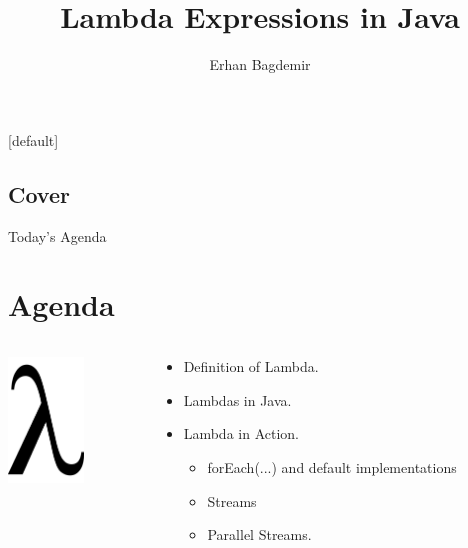 \documentclass{beamer}
\author[Bagdemir]{Erhan Bagdemir}
\title{{\fontsize{2em}{1em}\selectfont Lambda Expressions in Java}}
\institute{bagdemir.com - Follow on @ebagdemir}
\begin{document}
	[default]
	
	\begin{frame}
		\titlepage
		\section{Cover}
	\end{frame}

	\begin{frame}{Today's Agenda}
		\section{Agenda}
		\begin{columns}
    			\begin{column}{0.3\textwidth}
					\centering
					\includegraphics[width=2cm]{lambda}	
    			\end{column}
    			\begin{column}{0.7\textwidth}
        				\begin{itemize}
        					\item Definition of Lambda.
        					\item Lambdas in Java.
        					\item Lambda in Action.
							\begin{itemize}
								\item forEach(...) and default implementations
								\item Streams
    	    					\item Parallel Streams.
        					\end{itemize}
					
        				\end{itemize}
    		
    			\end{column}
		\end{columns}
	\end{frame}
	
\end{document}
